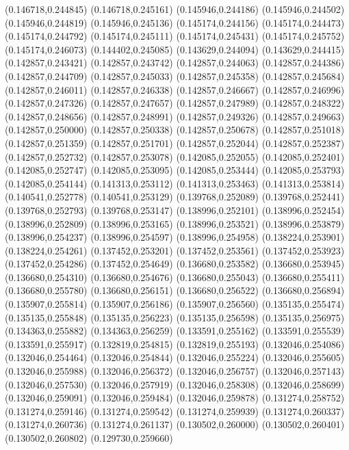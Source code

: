 (0.146718,0.244845)
(0.146718,0.245161)
(0.145946,0.244186)
(0.145946,0.244502)
(0.145946,0.244819)
(0.145946,0.245136)
(0.145174,0.244156)
(0.145174,0.244473)
(0.145174,0.244792)
(0.145174,0.245111)
(0.145174,0.245431)
(0.145174,0.245752)
(0.145174,0.246073)
(0.144402,0.245085)
(0.143629,0.244094)
(0.143629,0.244415)
(0.142857,0.243421)
(0.142857,0.243742)
(0.142857,0.244063)
(0.142857,0.244386)
(0.142857,0.244709)
(0.142857,0.245033)
(0.142857,0.245358)
(0.142857,0.245684)
(0.142857,0.246011)
(0.142857,0.246338)
(0.142857,0.246667)
(0.142857,0.246996)
(0.142857,0.247326)
(0.142857,0.247657)
(0.142857,0.247989)
(0.142857,0.248322)
(0.142857,0.248656)
(0.142857,0.248991)
(0.142857,0.249326)
(0.142857,0.249663)
(0.142857,0.250000)
(0.142857,0.250338)
(0.142857,0.250678)
(0.142857,0.251018)
(0.142857,0.251359)
(0.142857,0.251701)
(0.142857,0.252044)
(0.142857,0.252387)
(0.142857,0.252732)
(0.142857,0.253078)
(0.142085,0.252055)
(0.142085,0.252401)
(0.142085,0.252747)
(0.142085,0.253095)
(0.142085,0.253444)
(0.142085,0.253793)
(0.142085,0.254144)
(0.141313,0.253112)
(0.141313,0.253463)
(0.141313,0.253814)
(0.140541,0.252778)
(0.140541,0.253129)
(0.139768,0.252089)
(0.139768,0.252441)
(0.139768,0.252793)
(0.139768,0.253147)
(0.138996,0.252101)
(0.138996,0.252454)
(0.138996,0.252809)
(0.138996,0.253165)
(0.138996,0.253521)
(0.138996,0.253879)
(0.138996,0.254237)
(0.138996,0.254597)
(0.138996,0.254958)
(0.138224,0.253901)
(0.138224,0.254261)
(0.137452,0.253201)
(0.137452,0.253561)
(0.137452,0.253923)
(0.137452,0.254286)
(0.137452,0.254649)
(0.136680,0.253582)
(0.136680,0.253945)
(0.136680,0.254310)
(0.136680,0.254676)
(0.136680,0.255043)
(0.136680,0.255411)
(0.136680,0.255780)
(0.136680,0.256151)
(0.136680,0.256522)
(0.136680,0.256894)
(0.135907,0.255814)
(0.135907,0.256186)
(0.135907,0.256560)
(0.135135,0.255474)
(0.135135,0.255848)
(0.135135,0.256223)
(0.135135,0.256598)
(0.135135,0.256975)
(0.134363,0.255882)
(0.134363,0.256259)
(0.133591,0.255162)
(0.133591,0.255539)
(0.133591,0.255917)
(0.132819,0.254815)
(0.132819,0.255193)
(0.132046,0.254086)
(0.132046,0.254464)
(0.132046,0.254844)
(0.132046,0.255224)
(0.132046,0.255605)
(0.132046,0.255988)
(0.132046,0.256372)
(0.132046,0.256757)
(0.132046,0.257143)
(0.132046,0.257530)
(0.132046,0.257919)
(0.132046,0.258308)
(0.132046,0.258699)
(0.132046,0.259091)
(0.132046,0.259484)
(0.132046,0.259878)
(0.131274,0.258752)
(0.131274,0.259146)
(0.131274,0.259542)
(0.131274,0.259939)
(0.131274,0.260337)
(0.131274,0.260736)
(0.131274,0.261137)
(0.130502,0.260000)
(0.130502,0.260401)
(0.130502,0.260802)
(0.129730,0.259660)
